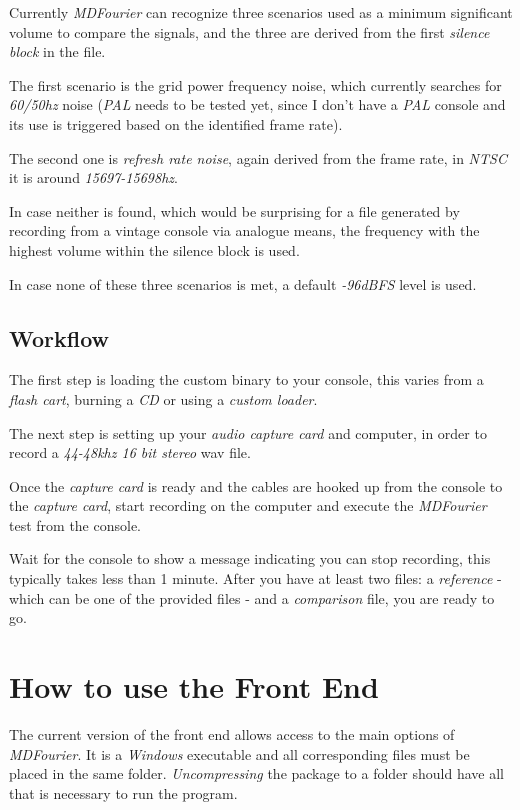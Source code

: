 \documentclass[10pt,a4paper]{report}
\begin{document}
Currently \textit{MDFourier} can recognize three scenarios used as a minimum significant volume to compare the signals, and the three are derived from the first \textit{silence block} in the file.

The first scenario is the grid power frequency noise, which currently searches for \textit{60/50hz} noise (\textit{PAL} needs to be tested yet, since I don't have a \textit{PAL} console and its use is triggered based on the identified frame rate). 

The second one is \textit{refresh rate noise}, again derived from the frame rate, in \textit{NTSC} it is around \textit{15697-15698hz}. 

In case neither is found, which would be surprising for a file generated by recording from a vintage console via analogue means, the frequency with the highest volume within the silence block is used. 

In case none of these three scenarios is met, a default \textit{-96dBFS} level is used.

\section{Workflow}

The first step is loading the custom binary to your console, this varies from a \textit{flash cart}, burning a \textit{CD} or using a \textit{custom loader}.

The next step is setting up your \textit{audio capture card} and computer, in order to record a \textit{44-48khz 16 bit stereo} wav file.

Once the \textit{capture card} is ready and the cables are hooked up from the console to the \textit{capture card}, start recording on the computer and execute the \textit{MDFourier} test from the console.

Wait for the console to show a message indicating you can stop recording, this typically takes less than 1 minute. After you have at least two files: a \textit{reference} - which can be one of the provided files -  and a \textit{comparison} file, you are ready to go. 

\chapter{How to use the Front End}
\label{usinggui}
The current version of the front end allows access to the main options of \textit{MDFourier}. It is a \textit{Windows} executable and all corresponding files must be placed in the same folder. \textit{Uncompressing} the package to a folder should have all that is necessary to run the program.
\end{document}
